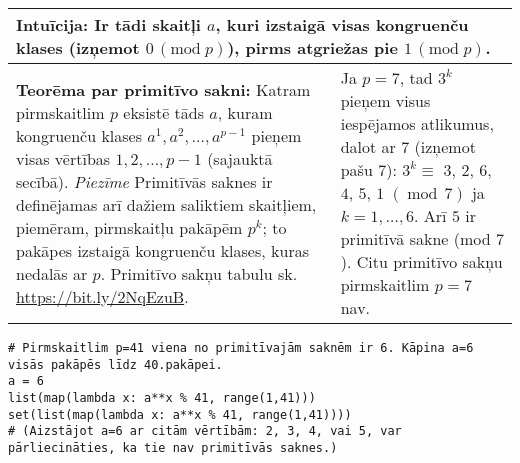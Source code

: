 \documentclass[a4paper]{article}
\begin{document}
\vspace{-10pt}
\renewcommand{\arraystretch}{1.2}
\begin{table}[ht!]\centering
{\small
\begin{tabular*}{18.46cm}{@{}|p{10.35cm}|p{7.25cm}|@{}} \hline
\multicolumn{2}{|p{18.05cm}|}{
\cellcolor[HTML]{E1FFE1}
Intuīcija: Ir tādi skaitļi $a$, kuri izstaigā visas kongruenču klases (izņemot $0\,(\text{mod}\;p)$), pirms atgriežas pie $1\,(\text{mod}\;p)$.
} \\ \hline
{\bf Teorēma par primitīvo sakni:} Katram pirmskaitlim $p$ eksistē tāds 
$a$, kuram kongruenču klases $a^1,a^2,\ldots,a^{p-1}$ pieņem visas
vērtības $1,2,\ldots,p-1$ (sajauktā secībā).\newline
{\em Piezīme} Primitīvās saknes ir definējamas arī dažiem saliktiem skaitļiem, piemēram, 
pirmskaitļu pakāpēm $p^k$; to pakāpes izstaigā kongruenču klases, kuras 
nedalās ar $p$.\newline 
Primitīvo sakņu tabulu sk. \url{https://bit.ly/2NqEzuB}.
 &
Ja $p=7$, tad $3^k$ pieņem visus iespējamos atlikumus, dalot ar $7$ (izņemot pašu $7$):\newline
$3^k \equiv$ $3$, $2$, $6$, $4$, $5$, $1\;(\operatorname{mod}\,7)$ ja $k=1,\ldots,6$.\newline
Arī $5$ ir primitīvā sakne (mod $7$). Citu primitīvo sakņu pirmskaitlim $p=7$ nav. \\ \hline
\end{tabular*}
}
\end{table}

{\small
\vspace{-10pt}
\begin{Verbatim}
# Pirmskaitlim p=41 viena no primitīvajām saknēm ir 6. Kāpina a=6 visās pakāpēs līdz 40.pakāpei.
a = 6
list(map(lambda x: a**x % 41, range(1,41)))
set(list(map(lambda x: a**x % 41, range(1,41))))
# (Aizstājot a=6 ar citām vērtībām: 2, 3, 4, vai 5, var pārliecināties, ka tie nav primitīvās saknes.)
\end{Verbatim}
}
\end{document}
